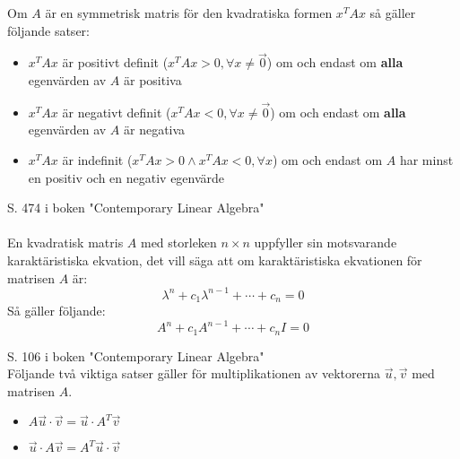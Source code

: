\documentclass{report}
\begin{document}
\pagebreak

{
Om $A$ är en symmetrisk matris för den kvadratiska formen $x^T A x$ så gäller följande satser:
\begin{itemize}
	\item $x^T A x$ är positivt definit ($x^T A x > 0, \forall x \ne \vec{0}$) om och endast om \textbf{alla} egenvärden av $A$ är positiva
	\item $x^T A x$ är negativt definit ($x^T A x < 0, \forall x \ne \vec{0}$) om och endast om \textbf{alla} egenvärden av $A$ är negativa
	\item $x^T A x$ är indefinit ($x^T A x > 0 \land x^T A x < 0, \forall x$) om och endast om $A$ har minst en positiv och en negativ egenvärde
\end{itemize}
}

{
S. 474 i boken "Contemporary Linear Algebra"\\\\

En kvadratisk matris $A$ med storleken $n \times n$ uppfyller sin motsvarande karaktäristiska ekvation, det vill säga att om karaktäristiska ekvationen för matrisen $A$ är:
\[
\lambda^n + c_1 \lambda^{n-1} + \cdots + c_n = 0
\]
Så gäller följande:
\[
A^n + c_1 A^{n-1} + \cdots + c_n I = 0
\]
}

{
S. 106 i boken "Contemporary Linear Algebra"\\
Följande två viktiga satser gäller för multiplikationen av vektorerna $ \vec{u}, \vec{v} $ med matrisen $A$.
\begin{itemize}
	\item $A \vec{u} \cdot \vec{v} = \vec{u} \cdot A^T \vec{v}$ 
	\item $\vec{u} \cdot A \vec{v} = A^T \vec{u} \cdot \vec{v}$
\end{itemize}
}
\end{document}
